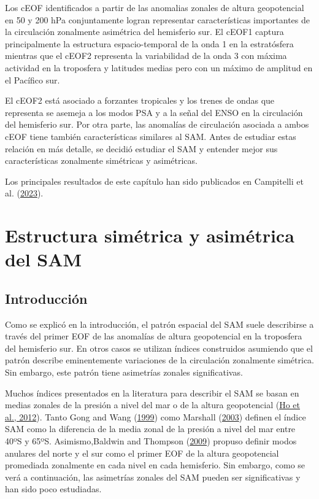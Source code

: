 \documentclass[12pt,oneside,a4paper]{reedthesis}
\begin{document}
Los cEOF identificados a partir de las anomalias zonales de altura geopotencial en 50 y 200 hPa conjuntamente logran representar características importantes de la circulación zonalmente asimétrica del hemisferio sur.
El cEOF1 captura principalmente la estructura espacio-temporal de la onda 1 en la estratósfera mientras que el cEOF2 representa la variabilidad de la onda 3 con máxima actividad en la troposfera y latitudes medias pero con un máximo de amplitud en el Pacífico sur.

El cEOF2 está asociado a forzantes tropicales y los trenes de ondas que representa se asemeja a los modos PSA y a la señal del ENSO en la circulación del hemisferio sur.
Por otra parte, las anomalías de circulación asociada a ambos cEOF tiene también características similares al SAM.
Antes de estudiar estas relación en más detalle, se decidió estudiar el SAM y entender mejor sus características zonalmente simétricas y asimétricas.

Los principales resultados de este capítulo han sido publicados en Campitelli et al. (\protect\hyperlink{ref-campitelli2023}{2023}).

\hypertarget{asymsam}{%
\chapter{Estructura simétrica y asimétrica del SAM}\label{asymsam}}

\hypertarget{introducciuxf3n-1}{%
\section{Introducción}\label{introducciuxf3n-1}}

Como se explicó en la introducción, el patrón espacial del SAM suele describirse a través del primer EOF de las anomalías de altura geopotencial en la troposfera del hemisferio sur.
En otros casos se utilizan índices construidos asumiendo que el patrón describe eminentemente variaciones de la circulación zonalmente simétrica.
Sin embargo, este patrón tiene asimetrías zonales significativas.

Muchos índices presentados en la literatura para describir el SAM se basan en medias zonales de la presión a nivel del mar o de la altura geopotencial (\protect\hyperlink{ref-ho2012}{Ho et al., 2012}).
Tanto Gong and Wang (\protect\hyperlink{ref-gong1999}{1999}) como Marshall (\protect\hyperlink{ref-marshall2003}{2003}) definen el índice SAM como la diferencia de la media zonal de la presión a nivel del mar entre 40ºS y 65ºS.
Asimismo,Baldwin and Thompson (\protect\hyperlink{ref-baldwin2009}{2009}) propuso definir modos anulares del norte y el sur como el primer EOF de la altura geopotencial promediada zonalmente en cada nivel en cada hemisferio.
Sin embargo, como se verá a continuación, las asimetrías zonales del SAM pueden ser significativas y han sido poco estudiadas.
\end{document}
